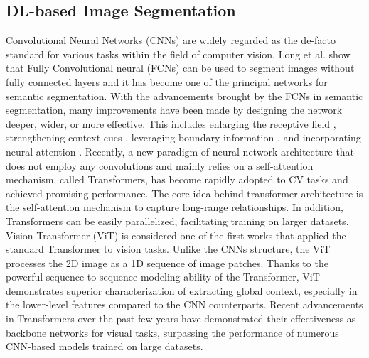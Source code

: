 \documentclass[journal]{IEEEtran}
\begin{document}
\subsection{DL-based Image Segmentation}

Convolutional Neural Networks (CNNs) are widely regarded as the de-facto standard for various tasks within the field of computer vision.
Long et al. \cite{long2015fully} show that Fully Convolutional neural (FCNs) can be used to segment images without fully connected layers and it has become one of the principal networks for semantic segmentation.
With the advancements brought by the FCNs in semantic segmentation, many improvements have been made by designing the network deeper, wider, or more effective. This includes enlarging the receptive field \cite{chen2017deeplab, dai2017deformable, chen2018encoder, yang2018denseaspp, hoang2022dam, le2021multi}, strengthening context cues \cite{le2018deep, he2019adaptive, le2021multi}, \cite{hsiao2021specialize,
hu2020class, jin2021mining, jin2021isnet, yu2020context, yuan2019segmentation, zhang2018context} 
leveraging boundary information \cite{bertasius2016semantic, le2021offset, ding2019boundary, le2021narrow, li2020improving, zhen2020joint}, and incorporating neural attention \cite{harley2017segmentation, he2019dynamic, zhao2018psanet, hu2018squeeze, huang2019ccnet, li2018pyramid, sun2020mining, wang2021hierarchical, wang2018non}.
Recently, a new paradigm of neural network architecture that does not employ any convolutions and mainly relies on a self-attention mechanism, called Transformers, has become rapidly adopted to CV tasks \cite{carion2020end, liu2022dab, li2022dn} and achieved promising performance.  
The core idea behind transformer architecture \cite{vaswani2017attention} is the self-attention mechanism to capture long-range relationships. 
In addition, Transformers can be easily parallelized, facilitating training on larger datasets. 
Vision Transformer (ViT) \cite{dosovitskiy2020image} is considered one of the first works that applied the standard Transformer to vision tasks. Unlike the CNNs structure, the ViT processes the 2D image as a 1D sequence of image patches. Thanks to the powerful sequence-to-sequence modeling ability of the Transformer, ViT demonstrates superior characterization of extracting global context, especially in the lower-level features compared to the CNN counterparts. 
Recent advancements in Transformers over the past few years have demonstrated their effectiveness as backbone networks for visual tasks, surpassing the performance of numerous CNN-based models trained on large datasets. 
\end{document}
